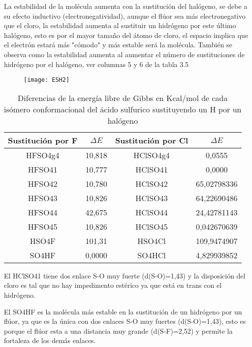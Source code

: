 La estabilidad de la molécula aumenta con la sustitución del halógeno, se debe a su efecto inductivo (electronegatividad), aunque el flúor sea más electronegativo que el cloro, la estabilidad aumenta al sustituir un hidrógeno por este último halógeno, esto es por el mayor tamaño del átomo de cloro, el espacio implica que el electrón estará  más "cómodo" y más estable será la molécula.
También se observa como la estabilidad aumenta al aumentar el número de sustituciones de hidrógeno por el halógeno, ver columnas 5 y 6 de la tabla 3.5

 

\begin{figure}[h]
\centering
\texttt{[image: ESH2]}
\end{figure}
\begin{table}[H]
\begin{center}
\begin{tabular}{|c|c|c|c|}
\hline
Sustitución por F & $\Delta E$ & Sustitución por Cl & $\Delta E$ \\ \hline
HFSO4g4	& 10,818 & HClSO4g4 & 0,0555 \\ \hline
HFSO41 & 10,777 & HClSO41 & 0,0000 \\ \hline
HFSO42 & 10,780 & HClSO42 & 65,02798336 \\ \hline
HFSO43 & 10,826 & HClSO43 & 64,22690486 \\ \hline
HFSO44 & 42,675 & HClSO44 & 24,42781143 \\ \hline
HFSO45 & 10,826 & HClSO45 & 0,042670639 \\ \hline
HSO4F &	101,31 & HSO4Cl & 109,9474907 \\ \hline
SO4HF &	0,0000 & SO4HCl & 4,829939852 \\ \hline
\end{tabular}
\caption{Diferencias de la energía libre de Gibbs en Kcal/mol de cada isómero conformacional del ácido sulfurico sustituyendo un H por un halógeno}
\end{center}
\end{table}
El HClSO41 tiene dos enlace S-O muy fuerte (d(S-O)=1,43) y la disposición del cloro es tal que no hay impedimento estérico ya que está en trans con el hidrógeno.

El SO4HF es la molécula más estable en la sustitución de un hidrógeno por un flúor, ya que es la única con dos enlaces S-O muy fuertes (d(S-O)=1,43), esto es porque el flúor esta a una distancia muy grande (d(S-F)=2,52) y permite la fortaleza de los demás enlaces.

